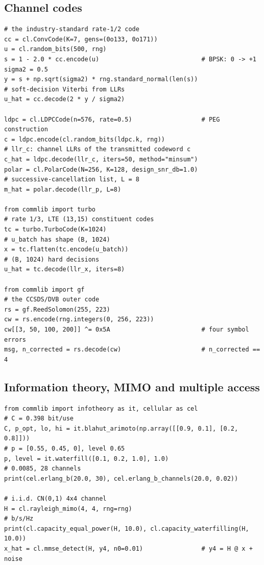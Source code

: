 \subsection{Channel codes}

\begin{lstlisting}
# the industry-standard rate-1/2 code
cc = cl.ConvCode(K=7, gens=(0o133, 0o171))
u = cl.random_bits(500, rng)
s = 1 - 2.0 * cc.encode(u)                            # BPSK: 0 -> +1
sigma2 = 0.5
y = s + np.sqrt(sigma2) * rng.standard_normal(len(s))
# soft-decision Viterbi from LLRs
u_hat = cc.decode(2 * y / sigma2)

ldpc = cl.LDPCCode(n=576, rate=0.5)                   # PEG construction
c = ldpc.encode(cl.random_bits(ldpc.k, rng))
# llr_c: channel LLRs of the transmitted codeword c
c_hat = ldpc.decode(llr_c, iters=50, method="minsum")
polar = cl.PolarCode(N=256, K=128, design_snr_db=1.0)
# successive-cancellation list, L = 8
m_hat = polar.decode(llr_p, L=8)

from commlib import turbo
# rate 1/3, LTE (13,15) constituent codes
tc = turbo.TurboCode(K=1024)
# u_batch has shape (B, 1024)
x = tc.flatten(tc.encode(u_batch))
# (B, 1024) hard decisions
u_hat = tc.decode(llr_x, iters=8)

from commlib import gf
# the CCSDS/DVB outer code
rs = gf.ReedSolomon(255, 223)
cw = rs.encode(rng.integers(0, 256, 223))
cw[[3, 50, 100, 200]] ^= 0x5A                         # four symbol errors
msg, n_corrected = rs.decode(cw)                      # n_corrected == 4
\end{lstlisting}


\subsection{Information theory, MIMO and multiple access}

\begin{lstlisting}
from commlib import infotheory as it, cellular as cel
# C = 0.398 bit/use
C, p_opt, lo, hi = it.blahut_arimoto(np.array([[0.9, 0.1], [0.2, 0.8]]))
# p = [0.55, 0.45, 0], level 0.65
p, level = it.waterfill([0.1, 0.2, 1.0], 1.0)
# 0.0085, 28 channels
print(cel.erlang_b(20.0, 30), cel.erlang_b_channels(20.0, 0.02))

# i.i.d. CN(0,1) 4x4 channel
H = cl.rayleigh_mimo(4, 4, rng=rng)
# b/s/Hz
print(cl.capacity_equal_power(H, 10.0), cl.capacity_waterfilling(H, 10.0))
x_hat = cl.mmse_detect(H, y4, n0=0.01)                # y4 = H @ x + noise
\end{lstlisting}

